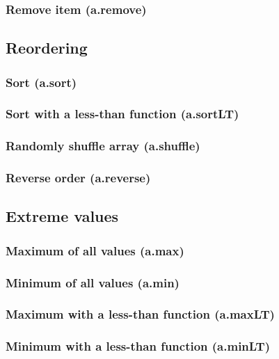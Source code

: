 \documentclass{article}
\theoremstyle{definition}
\begin{document}
\subsubsection{Remove item (a.remove)}

\subsection{Reordering}

\subsubsection{Sort (a.sort)}

\subsubsection{Sort with a less-than function (a.sortLT)}

\subsubsection{Randomly shuffle array (a.shuffle)}

\subsubsection{Reverse order (a.reverse)}

\subsection{Extreme values}

\subsubsection{Maximum of all values (a.max)}

\subsubsection{Minimum of all values (a.min)}

\subsubsection{Maximum with a less-than function (a.maxLT)}

\subsubsection{Minimum with a less-than function (a.minLT)}
\end{document}
